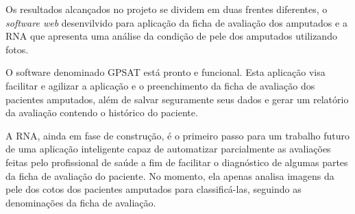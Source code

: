 Os resultados alcançados no projeto se dividem em duas frentes diferentes, o \textit{software web} desenvilvido para aplicação da ficha de avaliação dos amputados e a RNA que apresenta uma análise da condição de pele dos amputados utilizando fotos.

O software denominado GPSAT está pronto e funcional. Esta aplicação visa facilitar e agilizar a aplicação e o preenchimento da ficha de avaliação dos pacientes amputados, além de salvar seguramente seus dados e gerar um relatório da avaliação contendo o histórico do paciente.

A RNA, ainda em fase de construção, é o primeiro passo para um trabalho futuro de uma aplicação inteligente capaz de automatizar parcialmente as avaliações feitas pelo profissional de saúde a fim de facilitar o diagnóstico de algumas partes da ficha de avaliação do paciente. No momento, ela apenas analisa imagens da pele dos cotos dos pacientes amputados para classificá-las, seguindo as denominações da ficha de avaliação.